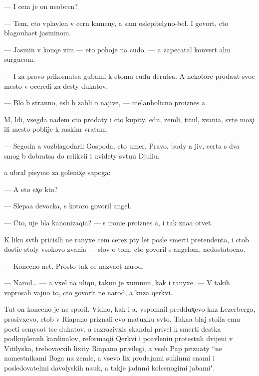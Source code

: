 \documentclass[10pt]{book}
\begin{document}
— I cem je on neob{\yi}cen?

— Tem, cto vplavlen v cern{\yi}{\y} kameny, a sam oslepitelyno-bel. I govor{\ia}t, cto blagouha{\y}et jasminom.

— Jasmin v konqe zim{\yi} — eto pohoje na cudo. — {\Y}a zapecatal konvert al{\yi}m surgucom.

— I za pravo prikosnutsa gubami k etomu cudu derutsa. A nekotor{\yi}{\y}e proda{\y}ut svo{\y}e mesto v oceredi za des{\ia}ty dukatov.

— B{\yi}lo b{\yi} stranno, {\y}esli b{\yi} zab{\yi}li o najive, — melanholicno pro{\y}iznes {\y}a.

M{\yi}, l{\iu}di, vsegda na{\y}dem cto prodaty i cto kupity. {\Y}edu, zemli, titul{\yi}, zvani{\y}a, sv{\ia}t{\yi}{\y}e mox̨i ili mesto poblije k ra{\y}skim vratam.

— Segodn{\ia} {\y}a vozblagodaril Gospoda, cto umer. Pravo, budy {\y}a jiv, certa s dva smog b{\yi} dobratsa do relikvi{\y}i i uvidety sv{\ia}tu{\y}u Djuli{\y}u.

{\Y}a ubral pisymo za golenix̨e sapoga:

— A eto {\y}ex̨e kto?

— Slepa{\y}a devocka, s kotoro{\y} govoril angel.

— Cto, uje b{\yi}la kanonizaqi{\y}a? — s ironi{\y}e{\y} pro{\y}iznes {\y}a, i tak zna{\y}a otvet.

K liku sv{\ia}t{\yi}h pricisl{\ia}li ne ranyxe cem cerez p{\ia}ty let posle smerti pretendenta, i ctob{\yi} dostic stoly v{\yi}sokovo zvani{\y}a — slov o tom, cto govoril s angelom, nedostatocno.

— Konecno net. Prosto tak {\y}e{\y}e naz{\yi}va{\y}et narod.

— Narod… — {\Y}a v{\yi}xel na uliqu, taku{\y}u je xumnu{\y}u, kak i ranyxe. — V takih voprosah vajno to, cto govorit ne narod, a kn{\ia}z{\y}a qerkvi.

Tut on konecno je ne sporil. Vidno, kak i {\y}a, vspomnil pred{\yi}dux̨evo kn{\ia}z{\ia} Lezerberga, prosivxevo, ctob{\yi} v Riapano priznali {\y}evo matuxku sv{\ia}to{\y}. Taka{\y}a blaj sto{\y}ila {\y}emu pocti semysot t{\yi}s{\ia}c dukatov, a razrazivxi{\y}s{\ia} skandal privel k smerti des{\ia}tka podkuplenn{\yi}h kardinalov, reformaqi{\y}i Qerkvi i po{\y}avleni{\y}u protestn{\yi}h dvijeni{\y} v Vitilyska, trebovavxih lixity Riapano privilegi{\y}, a vseh Pap priznaty ``ne namestnikami Boga na zemle, a vsevo lix prodajn{\yi}mi sukin{\yi}mi s{\yi}nami i posledovatel{\ia}mi d{\y}avolyskih nauk, a takje jadn{\yi}mi kolcenogimi jabami".
\end{document}
